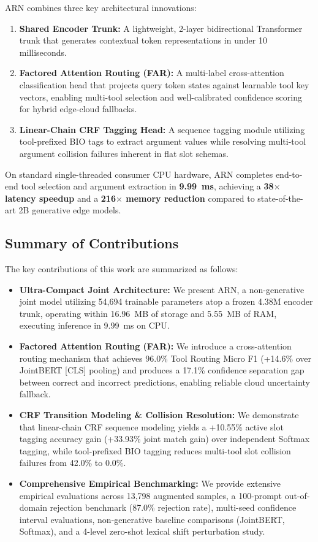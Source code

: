 \documentclass[letterpaper]{article} %
\begin{document}
ARN combines three key architectural innovations:
\begin{enumerate}
    \item \textbf{Shared Encoder Trunk:} A lightweight, 2-layer bidirectional Transformer trunk that generates contextual token representations in under 10 milliseconds.
    \item \textbf{Factored Attention Routing (FAR):} A multi-label cross-attention classification head that projects query token states against learnable tool key vectors, enabling multi-tool selection and well-calibrated confidence scoring for hybrid edge-cloud fallbacks.
    \item \textbf{Linear-Chain CRF Tagging Head:} A sequence tagging module utilizing tool-prefixed BIO tags to extract argument values while resolving multi-tool argument collision failures inherent in flat slot schemas.
\end{enumerate}

On standard single-threaded consumer CPU hardware, ARN completes end-to-end tool selection and argument extraction in \textbf{9.99~ms}, achieving a \textbf{38$\times$ latency speedup} and a \textbf{216$\times$ memory reduction} compared to state-of-the-art 2B generative edge models.

\subsection{Summary of Contributions}

The key contributions of this work are summarized as follows:
\begin{itemize}
    \item \textbf{Ultra-Compact Joint Architecture:} We present ARN, a non-generative joint model utilizing 54,694 trainable parameters atop a frozen 4.38M encoder trunk, operating within 16.96~MB of storage and 5.55~MB of RAM, executing inference in 9.99~ms on CPU.
    \item \textbf{Factored Attention Routing (FAR):} We introduce a cross-attention routing mechanism that achieves 96.0\% Tool Routing Micro F1 (+14.6\% over JointBERT [CLS] pooling) and produces a 17.1\% confidence separation gap between correct and incorrect predictions, enabling reliable cloud uncertainty fallback.
    \item \textbf{CRF Transition Modeling \& Collision Resolution:} We demonstrate that linear-chain CRF sequence modeling yields a +10.55\% active slot tagging accuracy gain (+33.93\% joint match gain) over independent Softmax tagging, while tool-prefixed BIO tagging reduces multi-tool slot collision failures from 42.0\% to 0.0\%.
    \item \textbf{Comprehensive Empirical Benchmarking:} We provide extensive empirical evaluations across 13,798 augmented samples, a 100-prompt out-of-domain rejection benchmark (87.0\% rejection rate), multi-seed confidence interval evaluations, non-generative baseline comparisons (JointBERT, Softmax), and a 4-level zero-shot lexical shift perturbation study.
\end{itemize}
\end{document}
